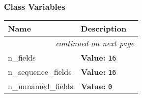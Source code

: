 
  \subsubsection{Class Variables}

    \vspace{-1cm}
\hspace{\varindent}\begin{longtable}{|p{\varnamewidth}|p{\vardescrwidth}|l}
\cline{1-2}
\cline{1-2} \centering \textbf{Name} & \centering \textbf{Description}& \\
\cline{1-2}
\endhead\cline{1-2}\multicolumn{3}{r}{\small\textit{continued on next page}}\\\endfoot\cline{1-2}
\endlastfoot\raggedright n\-\_\-f\-i\-e\-l\-d\-s\- & \raggedright \textbf{Value:} 
{\tt 16}&\\
\cline{1-2}
\raggedright n\-\_\-s\-e\-q\-u\-e\-n\-c\-e\-\_\-f\-i\-e\-l\-d\-s\- & \raggedright \textbf{Value:} 
{\tt 16}&\\
\cline{1-2}
\raggedright n\-\_\-u\-n\-n\-a\-m\-e\-d\-\_\-f\-i\-e\-l\-d\-s\- & \raggedright \textbf{Value:} 
{\tt 0}&\\
\cline{1-2}
\end{longtable}


